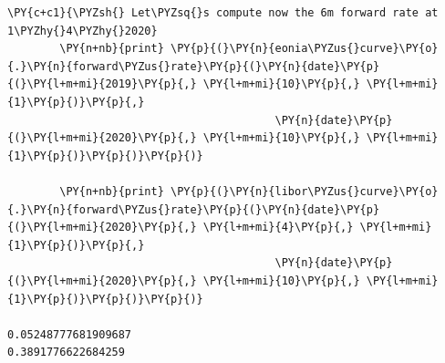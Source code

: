 \begin{tcolorbox}[breakable, size=fbox, boxrule=1pt, pad at break*=1mm,colback=cellbackground, colframe=cellborder]
\begin{Verbatim}[commandchars=\\\{\}]
\PY{c+c1}{\PYZsh{} Let\PYZsq{}s compute now the 6m forward rate at 1\PYZhy{}4\PYZhy{}2020}
        \PY{n+nb}{print} \PY{p}{(}\PY{n}{eonia\PYZus{}curve}\PY{o}{.}\PY{n}{forward\PYZus{}rate}\PY{p}{(}\PY{n}{date}\PY{p}{(}\PY{l+m+mi}{2019}\PY{p}{,} \PY{l+m+mi}{10}\PY{p}{,} \PY{l+m+mi}{1}\PY{p}{)}\PY{p}{,} 
                                         \PY{n}{date}\PY{p}{(}\PY{l+m+mi}{2020}\PY{p}{,} \PY{l+m+mi}{10}\PY{p}{,} \PY{l+m+mi}{1}\PY{p}{)}\PY{p}{)}\PY{p}{)}
        
        \PY{n+nb}{print} \PY{p}{(}\PY{n}{libor\PYZus{}curve}\PY{o}{.}\PY{n}{forward\PYZus{}rate}\PY{p}{(}\PY{n}{date}\PY{p}{(}\PY{l+m+mi}{2020}\PY{p}{,} \PY{l+m+mi}{4}\PY{p}{,} \PY{l+m+mi}{1}\PY{p}{)}\PY{p}{,} 
                                         \PY{n}{date}\PY{p}{(}\PY{l+m+mi}{2020}\PY{p}{,} \PY{l+m+mi}{10}\PY{p}{,} \PY{l+m+mi}{1}\PY{p}{)}\PY{p}{)}\PY{p}{)}

0.05248777681909687
0.3891776622684259
\end{Verbatim}
\end{tcolorbox}













